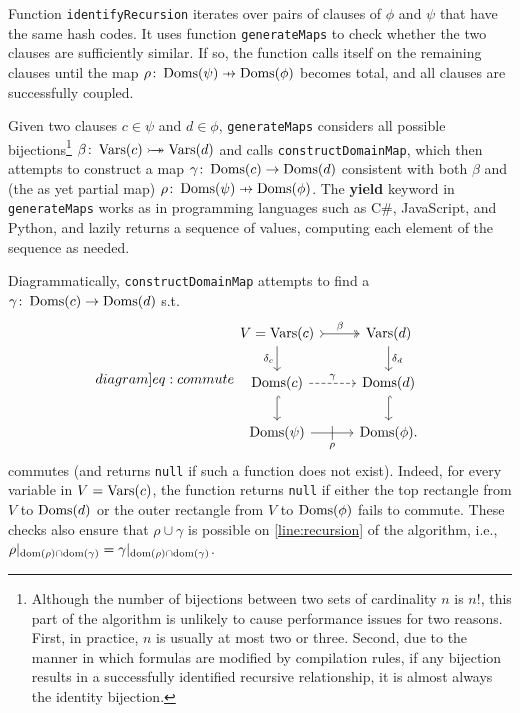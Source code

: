 Function \texttt{identifyRecursion} iterates over pairs of clauses of $\phi$ and
$\psi$ that have the same hash codes. It uses function \texttt{generateMaps} to
check whether the two clauses are sufficiently similar. If so, the function
calls itself on the remaining clauses until the map
$\rho\colon \Doms(\psi) \pfun \Doms(\phi)$ becomes total, and all clauses are
successfully coupled.

Given two clauses $c \in \psi$ and $d \in \phi$, \texttt{generateMaps} considers
all possible bijections\footnote{Although the number of bijections between two
  sets of cardinality $n$ is $n!$, this part of the algorithm is unlikely to
  cause performance issues for two reasons. First, in practice, $n$ is usually
  at most two or three. Second, due to the manner in which formulas are modified
  by compilation rules, if any bijection results in a successfully identified
  recursive relationship, it is almost always the identity bijection.}
$\beta\colon \operatorname{Vars}(c) \mathrel{\rightarrowtail\kern-1.9ex\twoheadrightarrow} \operatorname{Vars}(d)$ and calls
\texttt{constructDomainMap}, which then attempts to construct a map
$\gamma\colon \operatorname{Doms}(c) \to \operatorname{Doms}(d)$ consistent with both $\beta$ and (the as
yet partial map) $\rho\colon \Doms(\psi) \pfun \Doms(\phi)$. The \textbf{yield}
keyword in \texttt{generateMaps} works as in programming languages such as C\#,
JavaScript, and Python, and lazily returns a sequence of values, computing each
element of the sequence as needed.

Diagrammatically, \texttt{constructDomainMap} attempts to find a
$\gamma\colon \operatorname{Doms}(c) \to \operatorname{Doms}(d)$ s.t.
\begin{equation}\label[diagram]{eq:commute}
  \begin{tikzcd}
    V = \Vars(c) \ar[r, tail, two heads, "\beta"] \arrow[d, swap, "\delta_c"] & \Vars(d) \ar[d, "\delta_d"] \\
    \Doms(c) \ar[r, dashed, "\gamma"] \ar[d, hookrightarrow] & \Doms(d) \ar[d, hookrightarrow] \\
    \Doms(\psi) \ar[r, swap, "\rho", "|" marking, outer sep=5pt] & \Doms(\phi).
  \end{tikzcd}
\end{equation}
commutes (and returns \texttt{null} if such a function does not exist). Indeed,
for every variable in $V = \operatorname{Vars}(c)$, the function returns \texttt{null} if
either the top rectangle from $V$ to $\operatorname{Doms}(d)$ or the outer rectangle from $V$
to $\operatorname{Doms}(\phi)$ fails to commute. These checks also ensure that
$\rho \cup \gamma$ is possible on \cref{line:recursion} of the algorithm, i.e.,
$\rho|_{\operatorname{dom}(\rho)\cap\operatorname{dom}(\gamma)} = \gamma|_{\operatorname{dom}(\rho)\cap\operatorname{dom}(\gamma)}$.

